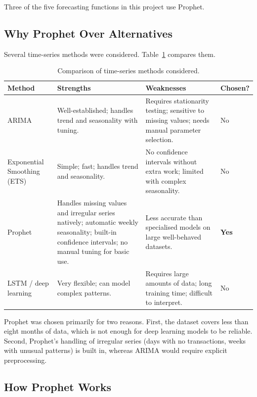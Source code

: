 \documentclass[12pt, a4paper]{report}
\begin{document}
Three of the five forecasting functions in this project use Prophet.

\subsection{Why Prophet Over Alternatives}

Several time-series methods were considered. Table~\ref{tab:method_compare} compares
them.

\begin{table}[H]
  \centering
  \caption{Comparison of time-series methods considered.\label{tab:method_compare}}
  \begin{tabular}{p{2.5cm} p{4cm} p{4cm} p{2cm}}
    \toprule
    \textbf{Method} & \textbf{Strengths} & \textbf{Weaknesses} & \textbf{Chosen?} \\
    \midrule
    ARIMA
      & Well-established; handles trend and seasonality with tuning.
      & Requires stationarity testing; sensitive to missing values; needs manual
        parameter selection.
      & No \\[4pt]
    Exponential Smoothing (ETS)
      & Simple; fast; handles trend and seasonality.
      & No confidence intervals without extra work; limited with complex seasonality.
      & No \\[4pt]
    Prophet
      & Handles missing values and irregular series natively; automatic weekly
        seasonality; built-in confidence intervals; no manual tuning for basic use.
      & Less accurate than specialised models on large well-behaved datasets.
      & \textbf{Yes} \\[4pt]
    LSTM / deep learning
      & Very flexible; can model complex patterns.
      & Requires large amounts of data; long training time; difficult to interpret.
      & No \\
    \bottomrule
  \end{tabular}
\end{table}

Prophet was chosen primarily for two reasons. First, the dataset covers less than
eight months of data, which is not enough for deep learning models to be reliable. Second,
Prophet's handling of irregular series (days with no transactions, weeks with unusual
patterns) is built in, whereas ARIMA would require explicit preprocessing.

\subsection{How Prophet Works}
\end{document}
